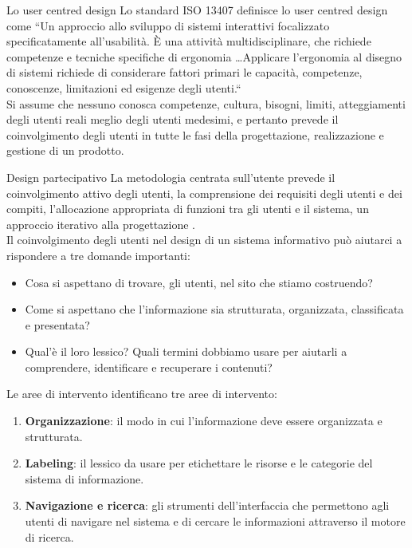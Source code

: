 \documentclass[pdf,mpa]{prosper}
\begin{document}
\begin{slide}{Lo user centred design}
Lo standard ISO 13407 definisce lo user centred design come ``Un approccio allo sviluppo di sistemi interattivi focalizzato specificatamente all'usabilità. È una attività multidisciplinare, che richiede competenze e tecniche specifiche di ergonomia \ldots Applicare l'ergonomia al disegno di sistemi richiede di considerare fattori primari le capacità, competenze, conoscenze, limitazioni ed esigenze degli utenti.``\\
Si assume che nessuno conosca competenze, cultura, bisogni, limiti, atteggiamenti degli utenti reali meglio degli utenti medesimi, e pertanto prevede il coinvolgimento degli utenti in tutte le fasi della progettazione, realizzazione e gestione di un prodotto.
\end{slide}

\begin{slide}{Design partecipativo}
La metodologia centrata sull'utente prevede il coinvolgimento attivo degli utenti, la comprensione dei requisiti degli utenti e dei compiti, l'allocazione appropriata di funzioni tra gli utenti e il sistema, un approccio iterativo alla progettazione \citep{Mao2001}.\\
Il coinvolgimento degli utenti nel design di un sistema informativo può aiutarci a rispondere a tre domande importanti:
\begin{itemize}
\item Cosa si aspettano di trovare, gli utenti, nel sito che stiamo costruendo?
\item Come si aspettano che l'informazione sia strutturata, organizzata, classificata e presentata?
\item Qual'è il loro lessico? Quali termini dobbiamo usare per aiutarli a comprendere, identificare e recuperare i contenuti?
\end{itemize}
\end{slide}

\begin{slide}{Le aree di intervento}
\cite{RosenfeldMorville1998} identificano tre aree di intervento:
\begin{enumerate}
\item \textbf{Organizzazione}: il modo in cui l'informazione deve essere organizzata e strutturata.
\item \textbf{Labeling}: il lessico da usare per etichettare le risorse e le categorie del sistema di informazione.
\item \textbf{Navigazione e ricerca}: gli strumenti dell'interfaccia che permettono agli utenti di navigare nel sistema e di cercare le informazioni attraverso il motore di ricerca.
\end{enumerate}
\end{slide}
\end{document}
